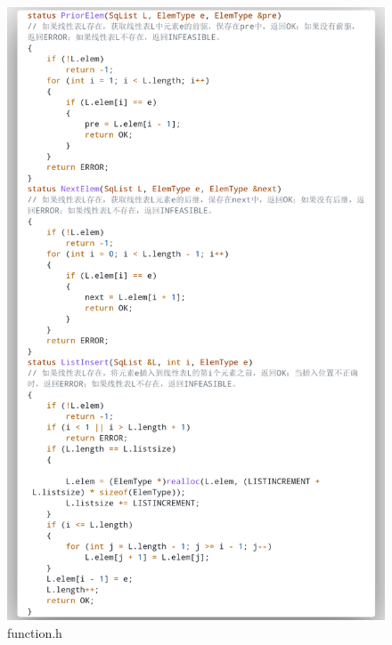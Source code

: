 \documentclass[supercite]{Experimental_Report}
\theoremstyle{definition}
\begin{document}
\begin{figure}[htb]
	\begin{center}
		\includegraphics[scale=0.30]{images/3-4.png}
		\caption{function.h}
		\label{fig3-4}
	\end{center}
\end{figure}
\end{document}
